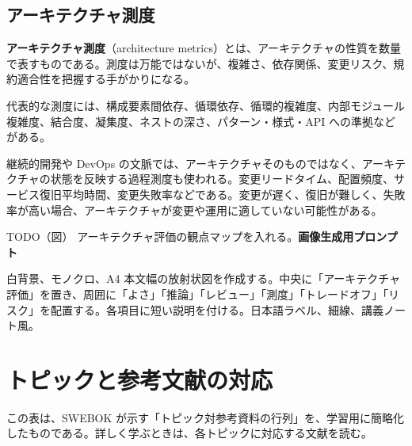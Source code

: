 \documentclass[a4paper,11pt]{ltjsarticle}
\newcommand{\todofig}[2]{\begin{statementbox}{TODO（図） #1}\textbf{画像生成用プロンプト}\par #2\end{statementbox}}
\newcommand{\keyterm}[1]{\textbf{#1}}
\newcommand{\en}[1]{（#1）}
\begin{document}
\subsection{アーキテクチャ測度}
\keyterm{アーキテクチャ測度}\en{architecture metrics}とは、アーキテクチャの性質を数量で表すものである。測度は万能ではないが、複雑さ、依存関係、変更リスク、規約適合性を把握する手がかりになる。

代表的な測度には、構成要素間依存、循環依存、循環的複雑度、内部モジュール複雑度、結合度、凝集度、ネストの深さ、パターン・様式・API への準拠などがある。

継続的開発や DevOps の文脈では、アーキテクチャそのものではなく、アーキテクチャの状態を反映する過程測度も使われる。変更リードタイム、配置頻度、サービス復旧平均時間、変更失敗率などである。変更が遅く、復旧が難しく、失敗率が高い場合、アーキテクチャが変更や運用に適していない可能性がある。

\todofig{アーキテクチャ評価の観点マップを入れる。}{白背景、モノクロ、A4 本文幅の放射状図を作成する。中央に「アーキテクチャ評価」を置き、周囲に「よさ」「推論」「レビュー」「測度」「トレードオフ」「リスク」を配置する。各項目に短い説明を付ける。日本語ラベル、細線、講義ノート風。}

\section{トピックと参考文献の対応}
この表は、SWEBOK が示す「トピック対参考資料の行列」を、学習用に簡略化したものである。詳しく学ぶときは、各トピックに対応する文献を読む。
\end{document}

